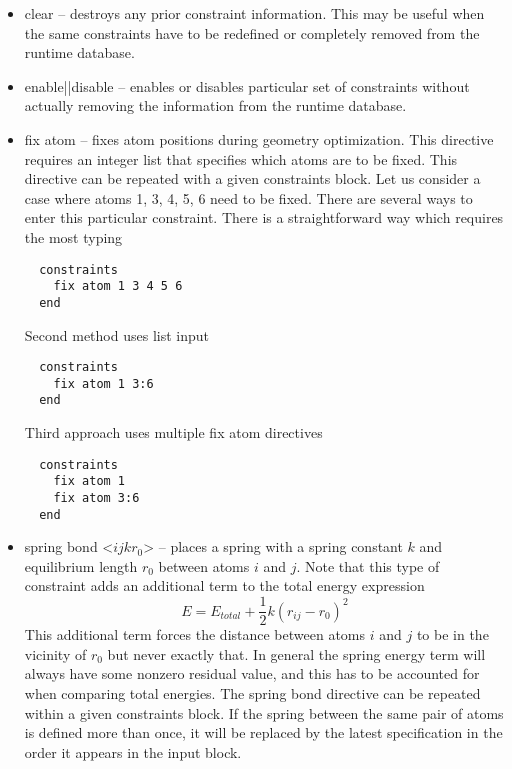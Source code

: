 \begin{itemize}
\item clear -- destroys any prior constraint information.  This may be
useful when the same constraints have to be redefined or completely removed from
the runtime database.

\item enable||disable -- enables or
disables particular set of constraints without actually removing the
information from the runtime database.

\item fix atom -- fixes atom positions during geometry optimization. This
directive requires an integer list that specifies which atoms are to be
fixed. This directive can be repeated with a given constraints block. Let us
consider a case where atoms 1, 3, 4, 5, 6 need to be fixed. There are several
ways to enter this particular constraint. 
There is a straightforward way which requires the most typing

\begin{verbatim}
  constraints
    fix atom 1 3 4 5 6
  end
\end{verbatim}

Second method uses list input
\begin{verbatim}
  constraints
    fix atom 1 3:6
  end
\end{verbatim}

Third approach uses multiple fix atom directives
\begin{verbatim}
  constraints
    fix atom 1
    fix atom 3:6
  end
\end{verbatim}

\item spring bond <$i j  k r_0$> -- places a spring with a spring constant $k$ and equilibrium length $r_0$
between atoms $i$ and $j$. Note that this type of constraint adds an additional term to 
the total energy expression
\[
E=E_{total}+\frac{1}{2}k(r_{ij}-r_0)^2
\]
This additional term forces the distance between atoms $i$ and $j$ to be in the vicinity of $r_0$ but never exactly that. In general
the spring energy term will always have some nonzero residual value, and this has to be accounted for when comparing total
energies. The spring bond directive can be repeated within a given constraints block. If the spring between the same pair of atoms
is defined more than once, it will be replaced by the latest specification in the order it appears in the input block.
\end{itemize}

